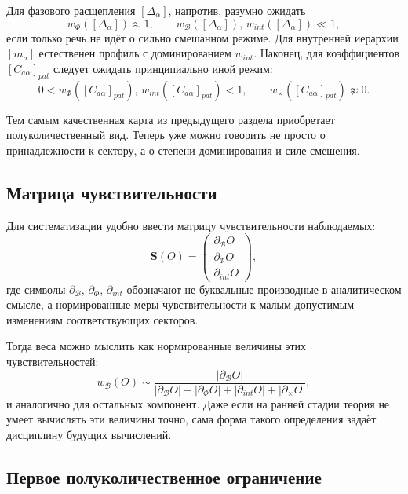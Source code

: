 \documentclass[12pt,a4paper]{article}
\begin{document}
Для фазового расщепления \([\Delta_{\alpha}]\), напротив, разумно ожидать
\begin{equation}
w_{\Phi}([\Delta_{\alpha}]) \approx 1,
\qquad
w_{\mathcal{B}}([\Delta_{\alpha}]),\, w_{int}([\Delta_{\alpha}]) \ll 1,
\end{equation}
если только речь не идёт о сильно смешанном режиме. Для внутренней иерархии \([m_a]\) естественен профиль с доминированием \(w_{int}\). Наконец, для коэффициентов \([C_{a\alpha}]_{pat}\) следует ожидать принципиально иной режим:
\begin{equation}
0 < w_{\Phi}([C_{a\alpha}]_{pat}),\, w_{int}([C_{a\alpha}]_{pat}) < 1,
\qquad
w_{\times}([C_{a\alpha}]_{pat}) \not\approx 0.
\end{equation}

Тем самым качественная карта из предыдущего раздела приобретает полуколичественный вид. Теперь уже можно говорить не просто о принадлежности к сектору, а о степени доминирования и силе смешения.

\subsection{Матрица чувствительности}

Для систематизации удобно ввести матрицу чувствительности наблюдаемых:
\begin{equation}
\mathbf{S}(O) =
\begin{pmatrix}
\partial_{\mathcal{B}} O \\
\partial_{\Phi} O \\
\partial_{int} O
\end{pmatrix},
\end{equation}
где символы \(\partial_{\mathcal{B}}\), \(\partial_{\Phi}\), \(\partial_{int}\) обозначают не буквальные производные в аналитическом смысле, а нормированные меры чувствительности к малым допустимым изменениям соответствующих секторов.

Тогда веса можно мыслить как нормированные величины этих чувствительностей:
\begin{equation}
w_{\mathcal{B}}(O) \sim \frac{|\partial_{\mathcal{B}} O|}{|\partial_{\mathcal{B}} O| + |\partial_{\Phi} O| + |\partial_{int} O| + |\partial_{\times} O|},
\end{equation}
и аналогично для остальных компонент. Даже если на ранней стадии теория не умеет вычислять эти величины точно, сама форма такого определения задаёт дисциплину будущих вычислений.

\subsection{Первое полуколичественное ограничение}
\end{document}
